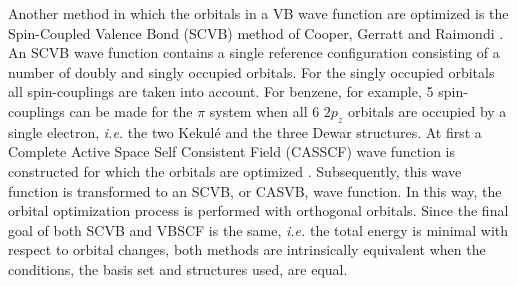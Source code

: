 Another method in which the orbitals in a VB wave function are optimized is the Spin-Coupled Valence Bond (SCVB) method of Cooper, Gerratt and Raimondi \cite{scvb1,scvb2,scvb3}. An SCVB wave function contains a single reference configuration consisting of a number of doubly and singly occupied orbitals. For the singly occupied orbitals all spin-couplings are taken into account. For benzene, for example, 5 spin-couplings can be made for the $\pi$ system when all 6 $2p_z$ orbitals are occupied by a single electron, \textit{i.e.} the two Kekul\'e and the three Dewar structures. At first a Complete Active Space Self Consistent Field (CASSCF) wave function is constructed for which the orbitals are optimized \cite{thor1,thor2,thor3,thor4}. Subsequently, this wave function is transformed to an SCVB, or CASVB, wave function. In this way, the orbital optimization process is performed with orthogonal orbitals. Since the final goal of both SCVB and VBSCF is the same, \textit{i.e.} the total energy is minimal with respect to orbital changes, both methods are intrinsically equivalent when the conditions, the basis set and structures used, are equal.


